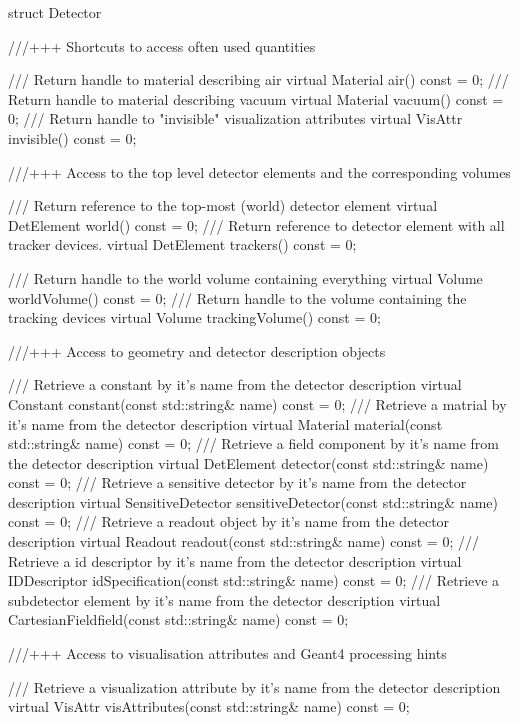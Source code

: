 \documentclass[10pt,a4paper]{article}
\begin{document}
\begin{code}
struct Detector {

  ///+++ Shortcuts to access often used quantities

  /// Return handle to material describing air
  virtual Material air() const = 0;
  /// Return handle to material describing vacuum
  virtual Material vacuum() const = 0;
  /// Return handle to "invisible" visualization attributes
  virtual VisAttr  invisible() const = 0;

  ///+++ Access to the top level detector elements and the corresponding volumes

  /// Return reference to the top-most (world) detector element
  virtual DetElement    world() const = 0;
  /// Return reference to detector element with all tracker devices.
  virtual DetElement    trackers() const = 0;

  /// Return handle to the world volume containing everything
  virtual Volume        worldVolume() const = 0;
  /// Return handle to the volume containing the tracking devices
  virtual Volume        trackingVolume() const = 0;

  ///+++ Access to geometry and detector description objects

  /// Retrieve a constant by it's name from the detector description
  virtual Constant      constant(const std::string& name)      const = 0;
  /// Retrieve a matrial by it's name from the detector description
  virtual Material      material(const std::string& name)      const = 0;
  /// Retrieve a field component by it's name from the detector description
  virtual DetElement    detector(const std::string& name)      const = 0;
  /// Retrieve a sensitive detector by it's name from the detector description
  virtual SensitiveDetector sensitiveDetector(const std::string& name) const = 0;
  /// Retrieve a readout object by it's name from the detector description
  virtual Readout       readout(const std::string& name)       const = 0;
  /// Retrieve a id descriptor by it's name from the detector description
  virtual IDDescriptor  idSpecification(const std::string& name)   const = 0;
  /// Retrieve a subdetector element by it's name from the detector description
  virtual CartesianFieldfield(const std::string& name)     const = 0;

  ///+++ Access to visualisation attributes and Geant4 processing hints

  /// Retrieve a visualization attribute by it's name from the detector description
  virtual VisAttr       visAttributes(const std::string& name) const = 0;

}
\end{code}
\end{document}
